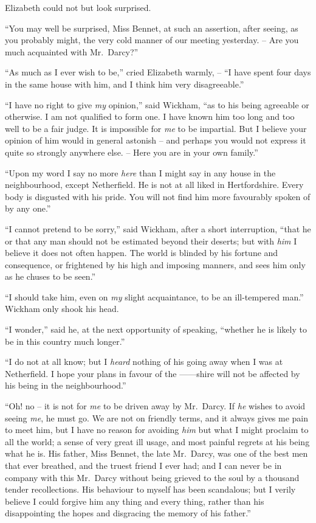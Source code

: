 Elizabeth could not but look surprised.

“You may well be surprised, Miss Bennet, at such an
assertion, after seeing, as you probably might, the very
cold manner of our meeting yesterday. -- Are you much
acquainted with Mr.\ Darcy?”

“As much as I ever wish to be,” cried Elizabeth
warmly, -- “I have spent four days in the same house
with him, and I think him very disagreeable.”

“I have no right to give \textit{my} opinion,” said Wickham,
“as to his being agreeable or otherwise. I am not qualified
to form one. I have known him too long and too well to
be a fair judge. It is impossible for \textit{me} to be impartial.
But I believe your opinion of him would in general
astonish -- and perhaps you would not express it quite so
strongly anywhere else. -- Here you are in your own family.”

“Upon my word I say no more \textit{here} than I might say
in any house in the neighbourhood, except Netherfield.
He is not at all liked in Hertfordshire. Every body is
disgusted with his pride. You will not find him more
favourably spoken of by any one.”

“I cannot pretend to be sorry,” said Wickham, after
a short interruption, “that he or that any man should
not be estimated beyond their deserts; but with \textit{him}
I believe it does not often happen. The world is blinded
by his fortune and consequence, or frightened by his high
and imposing manners, and sees him only as he chuses to
be seen.”

“I should take him, even on \textit{my} slight acquaintance,
to be an ill-tempered man.” Wickham only shook his
head.

“I wonder,” said he, at the next opportunity of
speaking, “whether he is likely to be in this country much
longer.”

“I do not at all know; but I \textit{heard} nothing of his going
away when I was at Netherfield. I hope your plans in
favour of the ------shire will not be affected by his being
in the neighbourhood.”

“Oh! no -- it is not for \textit{me} to be driven away by
Mr.\ Darcy. If \textit{he} wishes to avoid seeing \textit{me}, he must go.
We are not on friendly terms, and it always gives me pain
to meet him, but I have no reason for avoiding \textit{him}
but what I might proclaim to all the world; a sense of
very great ill usage, and most painful regrets at his being
what he is. His father, Miss Bennet, the late Mr.\ Darcy,
was one of the best men that ever breathed, and the truest
friend I ever had; and I can never be in company with
this Mr.\ Darcy without being grieved to the soul by a
thousand tender recollections. His behaviour to myself
has been scandalous; but I verily believe I could forgive
him any thing and every thing, rather than his disappointing
the hopes and disgracing the memory of his father.”

